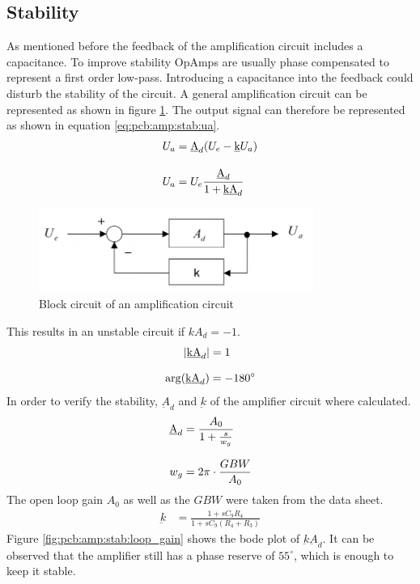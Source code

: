 \subsection{Stability}

As mentioned before the feedback of the amplification circuit includes a capacitance. To improve stability OpAmps are usually phase compensated to represent a first order low-pass. Introducing a capacitance into the feedback could disturb the stability of the circuit.\cite{okorn_analoge_2021}\p
A general amplification circuit can be represented as shown in figure \ref{fig:pcb:amp:stab:block}. The output signal can therefore be represented as shown in equation \ref{eq:pcb:amp:stab:ua}.
%
\begin{align}
  U_a &= \underbar{A}_d (U_e - \underbar{k}U_a)\pmath
  U_a &= U_e \cfrac{\underbar{A}_d}{1 + \underbar{k}\underbar{A}_d}\label{eq:pcb:amp:stab:ua}
\end{align}
%
\begin{figure}
  \centering
  \includegraphics[width=0.8\textwidth]{src/assets/pictures/circuit/amp_block_circuit.png}
  \caption{Block circuit of an amplification circuit\cite{okorn_analoge_2021}}\label{fig:pcb:amp:stab:block}
\end{figure}
%
This results in an unstable circuit if $kA_d = -1$.
%
\begin{align}
  |\underbar{k}\underbar{A}_d| &= 1\pmath
  \arg(\underbar{k}\underbar{A}_d) &= - 180^\circ
\end{align}
%
In order to verify the stability, $\underbar{A}_d$ and $\underbar{k}$ of the amplifier circuit where calculated.
%
\begin{align}
  \underbar{A}_d &= \frac{A_0}{1 + \frac{s}{w_g}}\pmath
  w_g &= 2\pi \cdot \frac{GBW}{A_0}
\end{align}
%
The open loop gain $A_0$ as well as the $GBW$ were taken from the data sheet.\cite{texas_instruments_tl08xx_2021}
%
\begin{align}
  \underbar{k} &= \frac{1 + s C_9 R_4}{1 + s C_9 (R_4 + R_3)}
\end{align}
%
Figure \ref{fig:pcb:amp:stab:loop_gain} shows the bode plot of $\underbar{k}\underbar{A}_d$. It can be observed that the amplifier still has a phase reserve of $55^\circ$, which is enough to keep it stable.
